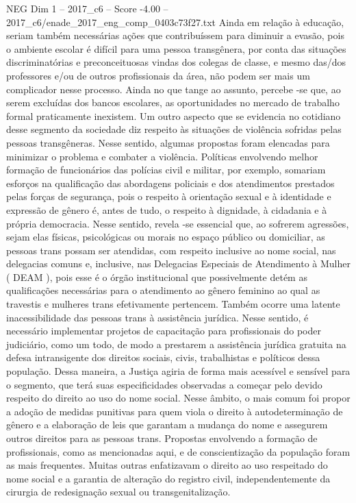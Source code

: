 \begin{textsample}{NEG Dim 1 – 2017\_c6 – Score -4.00 – 2017\_c6/enade\_2017\_eng\_comp\_0403c73f27.txt}
Ainda em relação à educação, seriam também necessárias ações que contribuíssem para diminuir a evasão, pois o ambiente escolar é difícil para uma pessoa transgênera, por conta das situações discriminatórias e preconceituosas vindas dos colegas de classe, e mesmo das/dos professores e/ou de outros profissionais da área, não podem ser mais um complicador nesse processo.
Ainda no que tange ao assunto, percebe -se que, ao serem excluídas dos bancos escolares, as oportunidades no mercado de trabalho formal praticamente inexistem.
Um outro aspecto que se evidencia no cotidiano desse segmento da sociedade diz respeito às situações de violência sofridas pelas pessoas transgêneras.
Nesse sentido, algumas propostas foram elencadas para minimizar o problema e combater a violência.
Políticas envolvendo melhor formação de funcionários das polícias civil e militar, por exemplo, somariam esforços na qualificação das abordagens policiais e dos atendimentos prestados pelas forças de segurança, pois o respeito à orientação sexual e à identidade e expressão de gênero é, antes de tudo, o respeito à dignidade, à cidadania e à própria democracia.
Nesse sentido, revela -se essencial que, ao sofrerem agressões, sejam elas físicas, psicológicas ou morais no espaço público ou domiciliar, as pessoas trans possam ser atendidas, com respeito inclusive ao nome social, nas delegacias comuns e, inclusive, nas Delegacias Especiais de Atendimento à Mulher ( DEAM ), pois esse é o órgão institucional que possivelmente detém as qualificações necessárias para o atendimento ao gênero feminino ao qual as travestis e mulheres trans efetivamente pertencem.
Também ocorre uma latente inacessibilidade das pessoas trans à assistência jurídica.
Nesse sentido, é necessário implementar projetos de capacitação para profissionais do poder judiciário, como um todo, de modo a prestarem a assistência jurídica gratuita na defesa intransigente dos direitos sociais, civis, trabalhistas e políticos dessa população.
Dessa maneira, a Justiça agiria de forma mais acessível e sensível para o segmento, que terá suas especificidades observadas a começar pelo devido respeito do direito ao uso do nome social.
Nesse âmbito, o mais comum foi propor a adoção de medidas punitivas para quem viola o direito à autodeterminação de gênero e a elaboração de leis que garantam a mudança do nome e assegurem outros direitos para as pessoas trans.
Propostas envolvendo a formação de profissionais, como as mencionadas aqui, e de conscientização da população foram as mais frequentes.
Muitas outras enfatizavam o direito ao uso respeitado do nome social e a garantia de alteração do registro civil, independentemente da cirurgia de redesignação sexual ou transgenitalização.

\end{textsample}
